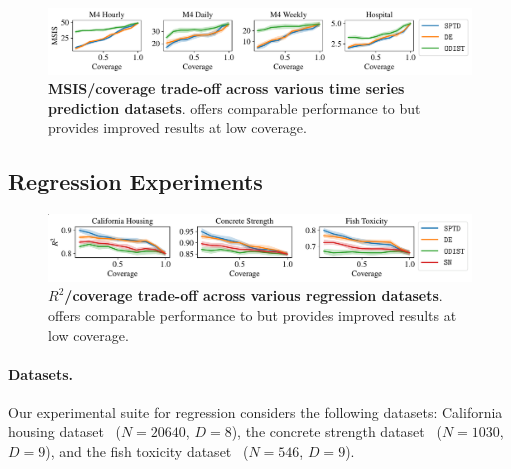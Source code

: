 \begin{figure}[t]
    \centering
    \includegraphics[width=0.97\linewidth]{figs/sptd/ts.pdf}
    \caption[MSIS/coverage trade-off across various time series prediction datasets.]{\textbf{MSIS/coverage trade-off across various time series prediction datasets}. \sptd offers comparable performance to \de but provides improved results at low coverage.}
    \label{fig:ts}
\end{figure}

\subsection{Regression Experiments}
\label{sec:regr_exp}

\begin{figure}[t]
    \centering
    \includegraphics[width=0.97\linewidth]{figs/sptd/regr_sn.pdf}
    \caption[$R^2$/coverage trade-off across various regression datasets.]{\textbf{$R^2$/coverage trade-off across various regression datasets}. \sptd offers comparable performance to \de but provides improved results at low coverage.}
    \label{fig:regr}
\end{figure}

\paragraph{Datasets.} Our experimental suite for regression considers the following datasets: %
California housing dataset~\citep{pace1997sparse} ($N=20640$, $D=8$), the concrete strength dataset~\citep{misc_concrete_compressive_strength_165} ($N=1030$, $D=9$), and the fish toxicity dataset~\citep{misc_qsar_fish_toxicity_504} ($N=546$, $D=9$). 

